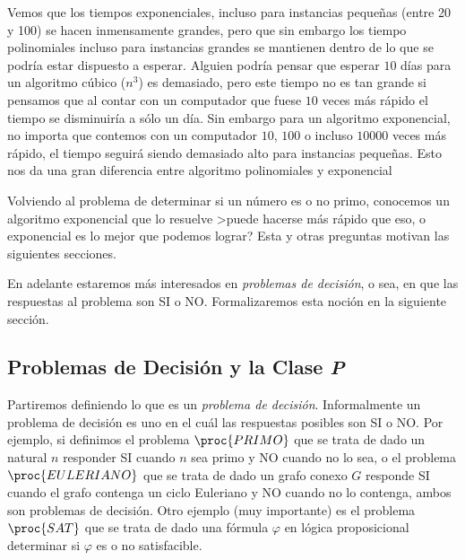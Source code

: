 Vemos que los tiempos exponenciales, incluso para instancias pequeñas (entre 20 y 100) se hacen inmensamente grandes, pero que sin embargo los tiempo polinomiales incluso para instancias grandes se mantienen dentro de lo que se podría estar dispuesto a esperar.
Alguien podría pensar que esperar $10$ días para un algoritmo cúbico ($n^3$) es demasiado, pero este tiempo no es tan grande si pensamos que al contar con un computador que fuese $10$ veces más rápido el tiempo se disminuiría a sólo un día.
Sin embargo para un algoritmo exponencial, no importa que contemos con un computador $10$, $100$ o incluso $10000$ veces más rápido, el tiempo seguirá siendo demasiado alto para instancias pequeñas.
Esto nos da una gran diferencia entre algoritmo polinomiales y exponencial 

Volviendo al problema de determinar si un número es o no primo, conocemos un algoritmo exponencial que lo resuelve >puede hacerse más rápido que eso, o exponencial es lo mejor que podemos lograr?
Esta y otras preguntas motivan las siguientes secciones.

En adelante estaremos más interesados en \emph{problemas de decisión}, o sea, en que las respuestas al problema son SI o NO.
Formalizaremos esta noción en la siguiente sección.

\subsection{%
Problemas de Decisión y la Clase \emph{P}}

Partiremos definiendo lo que es un \emph{problema de decisión}.
Informalmente un problema de decisión es uno en el cuál las respuestas posibles son SI o NO.
Por ejemplo, si definimos el problema $\proc{PRIMO}$ que se trata de dado un natural $n$ responder SI cuando $n$ sea primo y NO cuando no lo sea, o el problema $\proc{EULERIANO}$ que se trata de dado un grafo conexo $G$ responde SI cuando el grafo contenga un ciclo Euleriano y NO cuando no lo contenga, ambos son problemas de decisión.
Otro ejemplo (muy importante) es el problema $\proc{SAT}$ que se trata de dado una f\'ormula $\varphi$ en l\'ogica proposicional determinar si $\varphi$ es o no satisfacible.


